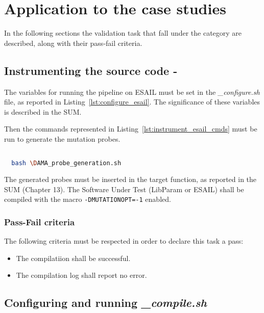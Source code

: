\STARTCHANGEDFINAL

\section{Application to the case studies}
\label{sec:case_studies}

In the following sections the validation task that fall under the  category are described, along with their pass-fail criteria.

\subsection{Instrumenting the source code - \DAMA}
\label{subsec:instrumenting}

The variables for running the \DAMA pipeline on ESAIL must be set in the \emph{\DAMA\_configure.sh} file, as reported in Listing~\ref{lst:configure_esail}. The significance of these variables is described in the SUM.

Then the commands represented in Listing~\ref{lst:instrument_esail_cmds} must be run to generate the mutation probes.

  \begin{lstlisting}[language=bash, label={lst:instrument_esail_cmds}]

  bash \DAMA_probe_generation.sh

  \end{lstlisting}

The generated probes must be inserted in the target function, as reported in the SUM (Chapter 13).
The Software Under Test (LibParam or ESAIL) shall be compiled with the macro \texttt{-DMUTATIONOPT=-1} enabled.

\subsubsection{Pass-Fail criteria}

The following criteria must be respected in order to declare this task a pass:
\begin{itemize}
  \item The compilatiion shall be successful.
  \item The compilation log shall report no error.
\end{itemize}

\subsection{Configuring and running \emph{\DAMA\_compile.sh}}

